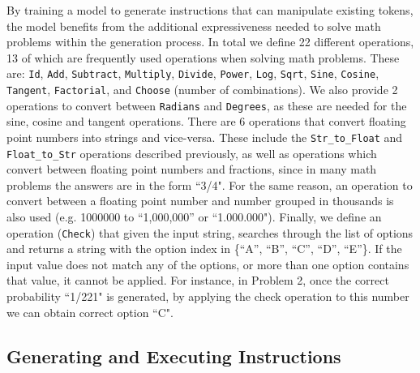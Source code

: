 By training a model to generate instructions that can manipulate existing tokens, the model benefits from the additional expressiveness needed to solve math problems within the generation process. In total we define 22 different operations, 13 of which are frequently used operations when solving math problems. These are: \texttt{Id}, \texttt{Add}, \texttt{Subtract}, \texttt{Multiply}, \texttt{Divide}, \texttt{Power}, \texttt{Log}, \texttt{Sqrt}, \texttt{Sine}, \texttt{Cosine}, \texttt{Tangent}, \texttt{Factorial}, and \texttt{Choose} (number of combinations). 
We also provide 2 operations to convert between \texttt{Radians} and \texttt{Degrees}, as these are needed for the sine, cosine and tangent operations. There are 6 operations that convert floating point numbers into strings and vice-versa. These include the \texttt{Str\_to\_Float} and \texttt{Float\_to\_Str} operations described previously, as well as operations which convert between floating point numbers and fractions, since in many math problems the answers are in the form ``3/4". For the same reason, an operation to convert between a floating point number and number grouped in thousands is also used (e.g. 1000000 to ``1,000,000'' or ``1.000.000").  Finally, we define an operation (\texttt{Check}) that given the input string, searches through the list of options and returns a string with the option index in \{``A'', ``B'', ``C'', ``D'', ``E''\}. If the input value does not match any of the options, or more than one option contains that value, it cannot be applied. For instance, in Problem 2, once the correct probability ``1/221" is generated, by applying the check operation to this number we can obtain correct option ``C".

\subsection{Generating and Executing Instructions}\label{sec:instr}



